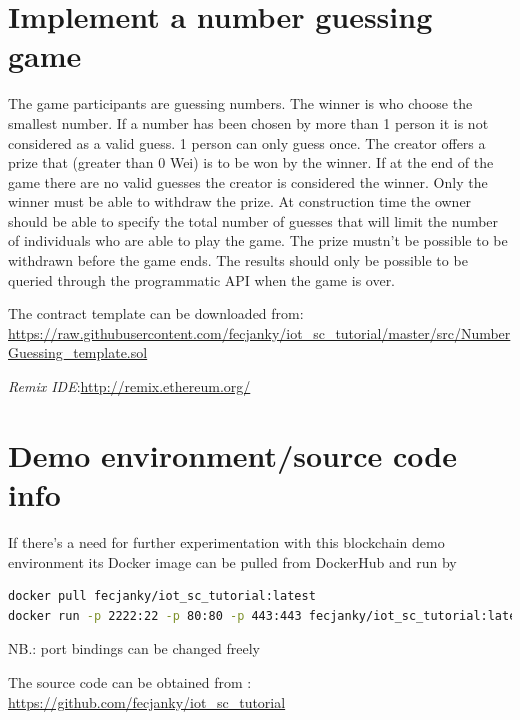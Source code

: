 \documentclass[a4paper]{article}
\begin{document}
\section{Implement a number guessing game}

The game participants are guessing numbers. The winner is who choose the smallest number. If a number has been chosen by more than 1 person it is not considered as a valid guess. 1 person can only guess once. The creator offers a prize that (greater than 0 Wei) is to be won by the winner. If at the end of the game there are no valid guesses the creator is considered the winner. Only the winner must be able to withdraw the prize. At construction time the owner should be able to specify the total number of guesses that will limit the number of individuals who are able to play the game. The prize mustn't be possible to be withdrawn before the game ends. The results should only be possible to be queried through the programmatic API when the game is over. 

The contract template can be downloaded from: \url{https://raw.githubusercontent.com/fecjanky/iot_sc_tutorial/master/src/NumberGuessing_template.sol}

\emph{Remix IDE}:\url{http://remix.ethereum.org/}

\section{Demo environment/source code info}

If there's a need for further experimentation with this blockchain demo environment its Docker image can be pulled from DockerHub and run by 

\begin{lstlisting}[language=bash]
docker pull fecjanky/iot_sc_tutorial:latest
docker run -p 2222:22 -p 80:80 -p 443:443 fecjanky/iot_sc_tutorial:latest
\end{lstlisting}

NB.: port bindings can be changed freely

The source code can be obtained from : \url{https://github.com/fecjanky/iot_sc_tutorial}
\end{document}
